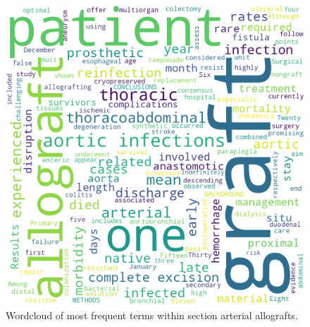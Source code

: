 \documentclass{qqtarticle}
\begin{document}
    \begin{figure}[H]
        \centering
        \includegraphics[width=.75\linewidth]{img/arterialallografts.png}
        \caption{Wordcloud of most frequent terms within section arterial allografts.}
        \label{fig:wcl_arterialallografts}
    \end{figure}
\end{document}
